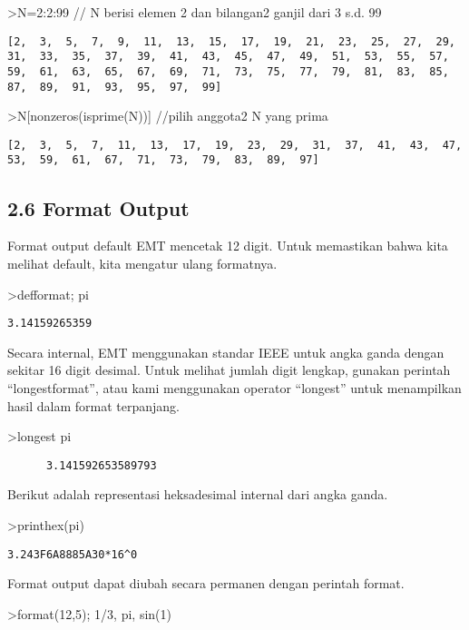 \documentclass[
]{book}
\begin{document}
\textgreater N=2:2:99 // N berisi elemen 2 dan bilangan2 ganjil dari 3 s.d. 99

\begin{verbatim}
[2,  3,  5,  7,  9,  11,  13,  15,  17,  19,  21,  23,  25,  27,  29,
31,  33,  35,  37,  39,  41,  43,  45,  47,  49,  51,  53,  55,  57,
59,  61,  63,  65,  67,  69,  71,  73,  75,  77,  79,  81,  83,  85,
87,  89,  91,  93,  95,  97,  99]
\end{verbatim}

\textgreater N{[}nonzeros(isprime(N)){]} //pilih anggota2 N yang prima

\begin{verbatim}
[2,  3,  5,  7,  11,  13,  17,  19,  23,  29,  31,  37,  41,  43,  47,
53,  59,  61,  67,  71,  73,  79,  83,  89,  97]
\end{verbatim}

\subsection{2.6 Format Output}\label{format-output}

Format output default EMT mencetak 12 digit. Untuk memastikan bahwa kita melihat default, kita mengatur ulang formatnya.

\textgreater defformat; pi

\begin{verbatim}
3.14159265359
\end{verbatim}

Secara internal, EMT menggunakan standar IEEE untuk angka ganda dengan sekitar 16 digit desimal. Untuk melihat jumlah digit lengkap, gunakan perintah ``longestformat'', atau kami menggunakan operator ``longest'' untuk menampilkan hasil dalam format terpanjang.

\textgreater longest pi

\begin{verbatim}
      3.141592653589793 
\end{verbatim}

Berikut adalah representasi heksadesimal internal dari angka ganda.

\textgreater printhex(pi)

\begin{verbatim}
3.243F6A8885A30*16^0
\end{verbatim}

Format output dapat diubah secara permanen dengan perintah format.

\textgreater format(12,5); 1/3, pi, sin(1)
\end{document}
